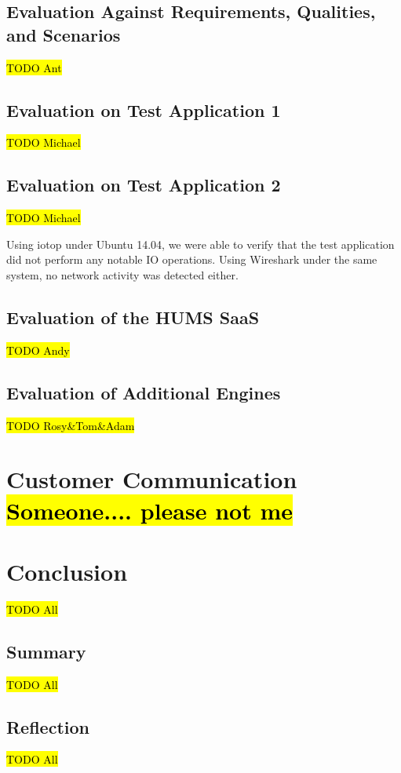 \documentclass[10pt,a4paper]{article}
\begin{document}
\subsection{Evaluation Against Requirements, Qualities, and Scenarios}
\label{sec:req_eval}
\hl{TODO Ant}

\subsection{Evaluation on Test Application 1}
\label{sec:test_app1}
\hl{TODO Michael}

\subsection{Evaluation on Test Application 2}
\label{sec:test_app2}
\hl{TODO Michael}

Using iotop under Ubuntu 14.04, we were able to verify that the test application did not perform any notable IO operations. Using Wireshark under the same system, no network activity was detected either.


\subsection{Evaluation of the HUMS SaaS}
\label{sec:hums_saas}
\hl{TODO Andy}


\subsection{Evaluation of Additional Engines}
\label{sec:additional}
\hl{TODO Rosy\&Tom\&Adam}

\section{Customer Communication \hl{Someone.... please not me}}
\label{sec:customer_comms}

\section{Conclusion}
\label{sec:conclusion}
\hl{TODO All}

\subsection{Summary}
\label{sec:summary}
\hl{TODO All}

\subsection{Reflection}
\label{sec:reflection}
\hl{TODO All}



\end{document}
